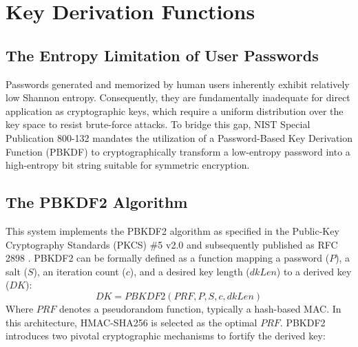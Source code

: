 \section{Key Derivation Functions}
\subsection{The Entropy Limitation of User Passwords}
Passwords generated and memorized by human users inherently exhibit relatively low Shannon entropy. Consequently, they are fundamentally inadequate for direct application as cryptographic keys, which require a uniform distribution over the key space to resist brute-force attacks. To bridge this gap, NIST Special Publication 800-132 \cite{nist800132} mandates the utilization of a Password-Based Key Derivation Function (PBKDF) to cryptographically transform a low-entropy password into a high-entropy bit string suitable for symmetric encryption.

\subsection{The PBKDF2 Algorithm}
This system implements the PBKDF2 algorithm as specified in the Public-Key Cryptography Standards (PKCS) \#5 v2.0 and subsequently published as RFC 2898 \cite{rfc2898}. PBKDF2 can be formally defined as a function mapping a password ($P$), a salt ($S$), an iteration count ($c$), and a desired key length ($dkLen$) to a derived key ($DK$):
\begin{equation}
    DK = PBKDF2(PRF, P, S, c, dkLen)
\end{equation}
Where $PRF$ denotes a pseudorandom function, typically a hash-based MAC. In this architecture, HMAC-SHA256 is selected as the optimal $PRF$. PBKDF2 introduces two pivotal cryptographic mechanisms to fortify the derived key:

